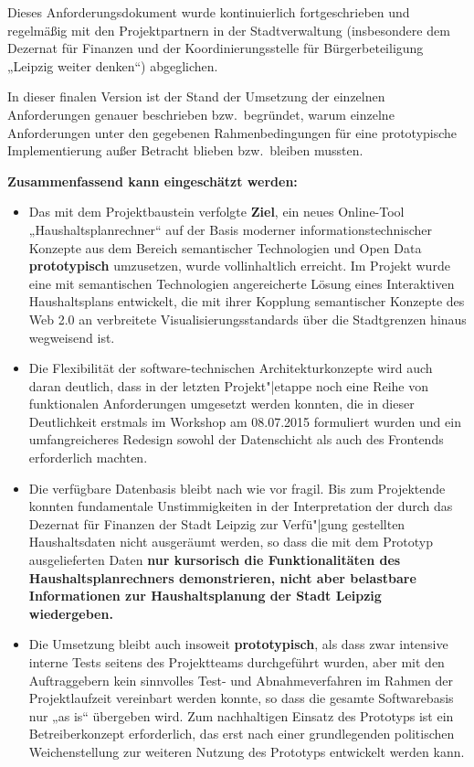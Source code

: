 \documentclass[11pt,a4paper,twoside]{article}
\begin{document}
Dieses Anforderungsdokument wurde kontinuierlich fortgeschrieben und
regelmäßig mit den Projektpartnern in der Stadtverwaltung (insbesondere dem
Dezernat für Finanzen und der Koordinierungsstelle für Bürgerbeteiligung
„Leipzig weiter denken“) abgeglichen.

In dieser finalen Version ist der Stand der Umsetzung der einzelnen
Anforderungen genauer beschrieben bzw.\ begründet, warum einzelne Anforderungen
unter den gegebenen Rahmenbedingungen für eine prototypische Implementierung
außer Betracht blieben bzw.\ bleiben mussten. 

\textbf{Zusammenfassend kann eingeschätzt werden:}
\begin{itemize}\itemsep0pt
\item Das mit dem Projektbaustein verfolgte \textbf{Ziel}, ein neues
  Online-Tool „Haushaltsplanrechner“ auf der Basis moderner
  informationstechnischer Konzepte aus dem Bereich semantischer Technologien
  und Open Data \textbf{prototypisch} umzusetzen, wurde vollinhaltlich
  erreicht.  Im Projekt wurde eine mit semantischen Technologien angereicherte
  Lösung eines Interaktiven Haushaltsplans entwickelt, die mit ihrer Kopplung
  semantischer Konzepte des Web 2.0 an verbreitete Visualisierungsstandards
  über die Stadtgrenzen hinaus wegweisend ist.

\item Die Flexibilität der software-technischen Architekturkonzepte wird auch
  daran deutlich, dass in der letzten Projekt"|etappe noch eine Reihe von
  funktionalen Anforderungen umgesetzt werden konnten, die in dieser
  Deutlichkeit erstmals im Workshop am 08.07.2015 formuliert wurden und ein
  umfangreicheres Redesign sowohl der Datenschicht als auch des Frontends
  erforderlich machten.
\item Die verfügbare Datenbasis bleibt nach wie vor fragil.  Bis zum
  Projektende konnten fundamentale Unstimmigkeiten in der Interpretation der
  durch das Dezernat für Finanzen der Stadt Leipzig zur Verfü"|gung gestellten
  Haushaltsdaten nicht ausgeräumt werden, so dass die mit dem Prototyp
  ausgelieferten Daten \textbf{nur kursorisch die Funktionalitäten des
    Haushaltsplanrechners demonstrieren, nicht aber belastbare Informationen
    zur Haushaltsplanung der Stadt Leipzig wiedergeben.}
\item Die Umsetzung bleibt auch insoweit \textbf{prototypisch}, als dass zwar
  intensive interne Tests seitens des Projektteams durchgeführt wurden, aber
  mit den Auftraggebern kein sinnvolles Test- und Abnahmeverfahren im Rahmen
  der Projektlaufzeit vereinbart werden konnte, so dass die gesamte
  Softwarebasis nur „as is“ übergeben wird.  Zum nachhaltigen Einsatz des
  Prototyps ist ein Betreiberkonzept erforderlich, das erst nach einer
  grundlegenden politischen Weichenstellung zur weiteren Nutzung des Prototyps
  entwickelt werden kann.
\end{itemize}
\end{document}
